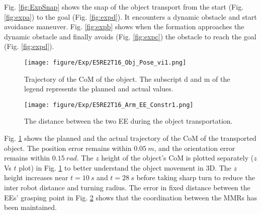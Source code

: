 Fig. \ref{fig:ExpSnap} shows the snap of the object transport from the start (Fig. \ref{fig:expa}) to the goal (Fig. \ref{fig:expd}). It encounters a dynamic obstacle and start avoidance maneuver. Fig. \ref{fig:expb} shows when the formation approaches the dynamic obstacle and finally avoids (Fig. \ref{fig:expc}) the obstacle to reach the goal (Fig. \ref{fig:expd}).

\begin{figure}[htbp]
	\centerline{\texttt{[image: figure/Exp/E5RE2T16\_Obj\_Pose\_vi1.png]}}
	\caption{Trajectory of the CoM of the object. The subscript d and m of the legend represents the planned and actual values.}
	\label{fig:obj_pose}
\end{figure}


\begin{figure}[htbp]
	\centerline{\texttt{[image: figure/Exp/E5RE2T16\_Arm\_EE\_Constr1.png]}}
	\caption{The distance between the two EE during the object transportation.}
	\label{fig:ee_constr}
\end{figure}

Fig. \ref{fig:obj_pose} shows the planned and the actual trajectory of the CoM of the transported object. The position error remains within $0.05\ m$, and the orientation error remains within $0.15\ rad$. The $z$ height of the object's CoM is plotted separately ($z$ Vs $t$ plot) in Fig. \ref{fig:obj_pose} to better understand the object movement in 3D. The  $z$  height increases near $t = 10\ s$ and $t = 28\ s$ before taking sharp turn to reduce the inter robot distance and turning radius. The error in fixed distance between the EEs' grasping point in Fig. \ref{fig:ee_constr} shows that the coordination between the MMRs has been maintained. 
